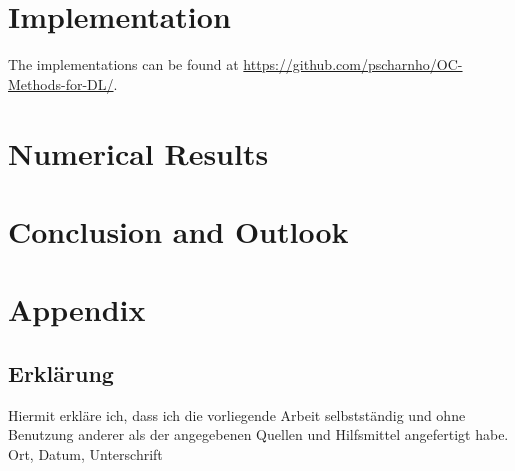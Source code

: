 \documentclass[a4paper, 12pt]{scrreprt} %
\begin{document}
\chapter{Implementation}
\label{chap:Impl}

The implementations can be found at \url{https://github.com/pscharnho/OC-Methods-for-DL/}.









\chapter{Numerical Results}
\label{chap:NR}



\chapter{Conclusion and Outlook}
\label{chap:CaO}

\clearpage
\appendix
\chapter{Appendix}


\clearpage



\newpage
\section*{Erklärung}		
\thispagestyle{empty}				


Hiermit erkläre ich, dass ich die vorliegende Arbeit selbstständig und ohne Benutzung anderer als der angegebenen Quellen und Hilfsmittel angefertigt habe.
\newline\newline
Ort, Datum, Unterschrift
\end{document}
